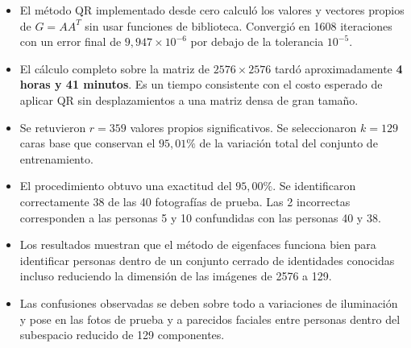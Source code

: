 \documentclass[12pt, letterpaper]{article}
\begin{document}
\begin{itemize}
    \item El método QR implementado desde cero calculó los
    valores y vectores propios de $G = AA^{T}$ sin usar funciones
    de biblioteca. Convergió en 1608 iteraciones con un error
    final de $9{,}947 \times 10^{-6}$ por debajo de la tolerancia
    $10^{-5}$.

    \item El cálculo completo sobre la matriz de $2576 \times 2576$
    tardó aproximadamente \textbf{4 horas y 41 minutos}. Es un
    tiempo consistente con el costo esperado de aplicar QR sin
    desplazamientos a una matriz densa de gran tamaño.

    \item Se retuvieron $r = 359$ valores propios significativos.
    Se seleccionaron $k = 129$ caras base que conservan el
    $95{,}01\%$ de la variación total del conjunto de
    entrenamiento.

    \item El procedimiento obtuvo una exactitud del
    \textbf{$95{,}00\%$}. Se identificaron correctamente 38 de las
    40 fotografías de prueba. Las 2 incorrectas corresponden a
    las personas 5 y 10 confundidas con las personas 40 y 38.

    \item Los resultados muestran que el método de eigenfaces
    funciona bien para identificar personas dentro de un conjunto
    cerrado de identidades conocidas incluso reduciendo la
    dimensión de las imágenes de 2576 a 129.

    \item Las confusiones observadas se deben sobre todo a
    variaciones de iluminación y pose en las fotos de prueba y a
    parecidos faciales entre personas dentro del subespacio
    reducido de 129 componentes.
\end{itemize}
\end{document}
